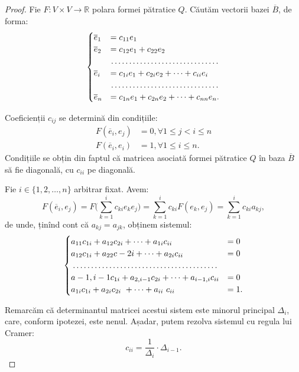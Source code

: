\begin{proof}
	Fie $F : V \times V \to \mathbb{R}$ polara formei pătratice $Q$. Căutăm
vectorii bazei $\overline{B}$, de forma:
\begin{equation}
    \label{equation:sistem-coef-jacobi}
	\begin{cases}	
	    \overline{e}_1 &= c_{11} e_1 \\
	    \overline{e}_2 &= c_{12} e_1 + c_{22}e_2 \\
	    & \dotfill \\
	    \overline{e}_i &= c_{1i}e_1 + c_{2i} e_2 + \dots + c_{ii}e_i \\
	    & \dotfill \\
	    \overline{e}_n &= c_{1n}e_1 + c_{2n} e_2 + \dots + c_{nn} e_n.
    \end{cases}
\end{equation}

Coeficienții $c_{ij}$ se determină din condițiile:
\begin{align*}
	F(\overline{e}_i, e_j) &= 0, \forall 1 \leq j < i \leq n \\
	F(\overline{e}_i, e_i) &= 1, \forall 1 \leq i \leq n.
\end{align*}
Condițiile se obțin din faptul că matricea asociată formei pătratice $Q$ în
baza $\overline{B}$ să fie diagonală, cu $c_{ii}$ pe diagonală.

Fie $i \in \{1, 2, \dots, n\}$ arbitrar fixat. Avem: 
 \[
	F(\overline{e}_i, e_j) = F \Big( \sum_{k = 1}^i c_{ki} e_k e_j \Big) =
	                         \sum_{k = 1}^i c_{ki} F(e_k, e_j) =
	                         \sum_{k = 1}^i c_{ki} a_{kj},
\]
de unde, ținînd cont că $a_{kj} = a_{jk}$, obținem sistemul: 
 \[
	\begin{cases}	
	    a_{11} c_{1i} + a_{12} c_{2i} + \dots + a_{1i} c_{ii} &= 0 \\
	    a_{12} c_{1i} + a_{22} c-{2i} + \dots + a_{2i} c_{ii} &= 0 \\
	    \dotfill \\
	    a-{1, i-1} c_{1i} + a_{2, i-1}c_{2i} + \dots + a_{i-1, i} c_{ii} &= 0 \\
	    a_{1i} c_{1i} + a_{2i} c_{2i} + \dots + a_{ii} c_{ii} &= 1.
    \end{cases}
\]

Remarcăm că determinantul matricei acestui sistem este minorul principal
$\Delta_i$, care, conform ipotezei, este nenul. Așadar, putem rezolva sistemul
cu regula lui Cramer: 
 \[
	c_{ii} = \dfrac{1}{\Delta_i} \cdot \Delta_{i-1}.
\]


\end{proof}
